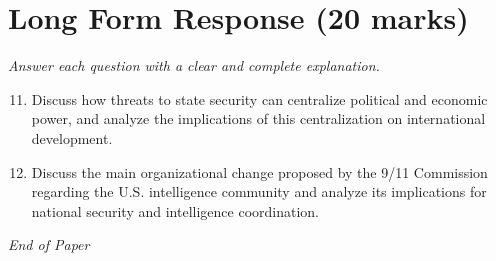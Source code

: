 \documentclass[12pt]{article}
\begin{document}
\section*{Long Form Response (20 marks)}
\textit{Answer each question with a clear and complete explanation.}
\begin{enumerate}[label=\arabic*.]
\setcounter{enumi}{10}
\item Discuss how threats to state security can centralize political and economic power, and analyze the implications of this centralization on international development.
\item Discuss the main organizational change proposed by the 9/11 Commission regarding the U.S. intelligence community and analyze its implications for national security and intelligence coordination.
\end{enumerate}

\vfill
\noindent\textit{End of Paper}
\end{document}
